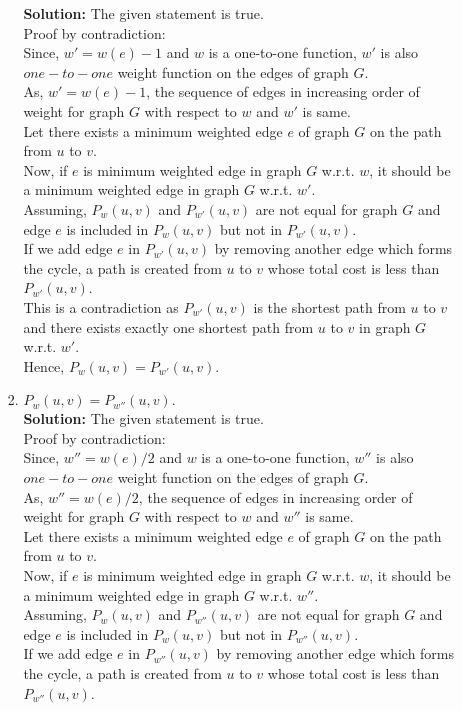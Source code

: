 \documentclass[12pt]{article}
\begin{document}
\begin{enumerate}
\begin{enumerate}
\begin{enumerate}
\textbf{Solution:} The given statement is true.\\
Proof by contradiction:\\
Since, $w' =w(e) - 1$ and $w$ is a one-to-one function, $w'$ is also $one-to-one$ weight function on the edges of graph $G$.\\
As, $w' =w(e) - 1$, the sequence of edges in increasing order of weight for graph $G$ with respect to $w$ and $w'$ is same.\\
Let there exists a minimum weighted edge $e$ of graph $G$ on the path from $u$ to $v$.\\
Now, if $e$ is minimum weighted edge in graph $G$ w.r.t. $w$, it should be a minimum weighted edge in graph $G$ w.r.t. $w'$.\\
Assuming, $P_{w}(u,v)$ and $P_{w'}(u,v)$ are not equal for graph $G$ and edge $e$ is included in $P_{w}(u,v)$ but not in $P_{w'}(u,v)$. \\
If we add edge $e$ in $P_{w'}(u,v)$ by removing another edge which forms the cycle, a path is created from $u$ to $v$ whose total cost is less than $P_{w'}(u,v)$.\\
This is a contradiction as $P_{w'}(u,v)$ is the shortest path from $u$ to $v$ and there exists exactly one shortest path from $u$ to $v$ in graph $G$ w.r.t. $w'$.\\
Hence, $P_{w}(u,v) = P_{w'}(u,v)$.\\
\pagebreak
\item $P_w(u, v) = P_{w''}(u, v).$\\
\textbf{Solution:} The given statement is true.\\
Proof by contradiction:\\
Since, $w'' =w(e)/2$ and $w$ is a one-to-one function, $w''$ is also $one-to-one$ weight function on the edges of graph $G$.\\
As, $w'' =w(e)/2$, the sequence of edges in increasing order of weight for graph $G$ with respect to $w$ and $w''$ is same.\\
Let there exists a minimum weighted edge $e$ of graph $G$ on the path from $u$ to $v$.\\
Now, if $e$ is minimum weighted edge in graph $G$ w.r.t. $w$, it should be a minimum weighted edge in graph $G$ w.r.t. $w''$.\\
Assuming, $P_{w}(u,v)$ and $P_{w''}(u,v)$ are not equal for graph $G$ and edge $e$ is included in $P_{w}(u,v)$ but not in $P_{w''}(u,v)$. \\
If we add edge $e$ in $P_{w''}(u,v)$ by removing another edge which forms the cycle, a path is created from $u$ to $v$ whose total cost is less than $P_{w''}(u,v)$.\\

\end{enumerate}
\end{enumerate}
\end{enumerate}
\end{document}
